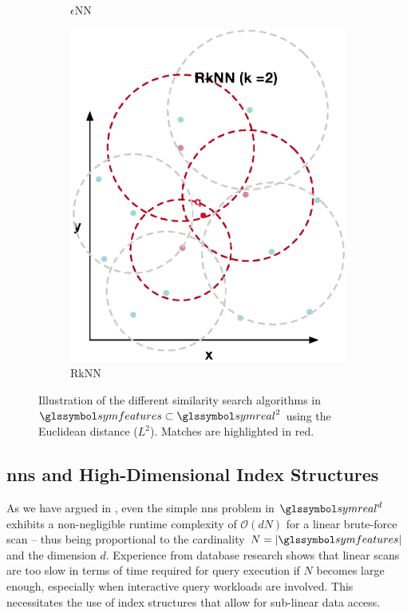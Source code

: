 \begin{figure}
\begin{subfigure}[b]{0.25\textwidth}
        \caption{$\epsilon$NN}
        \label{fig:enn}
    \end{subfigure}
    \hfill
    \begin{subfigure}[b]{0.25\textwidth}
        \centering
        \includegraphics[width=\textwidth]{figures/rknn}
        \caption{RkNN}
        \label{fig:rknn}
    \end{subfigure}
    \caption{Illustration of the different similarity search algorithms in $\symfeatures \subset \symreal^2$ using the Euclidean distance ($L^2$). Matches are highlighted in red.}
    \label{fig:sim_search_algorithm}
\end{figure}

\subsection{\texorpdfstring{\acrshort{nns}}{NNS} and High-Dimensional Index Structures}
\label{section:hd_index_structures}

As we have argued in , even the simple \acrshort{nns} problem in $\symreal^d$ exhibits a non-negligible runtime complexity of $\mathcal{O}(dN)$ for a linear brute-force scan -- thus being proportional to the cardinality $N = |\symfeatures|$ and the dimension $d$. Experience from database research shows that linear scans are too slow in terms of time required for query execution if $N$ becomes large enough, especially when interactive query workloads are involved. This necessitates the use of index structures that allow for sub-linear data access.

